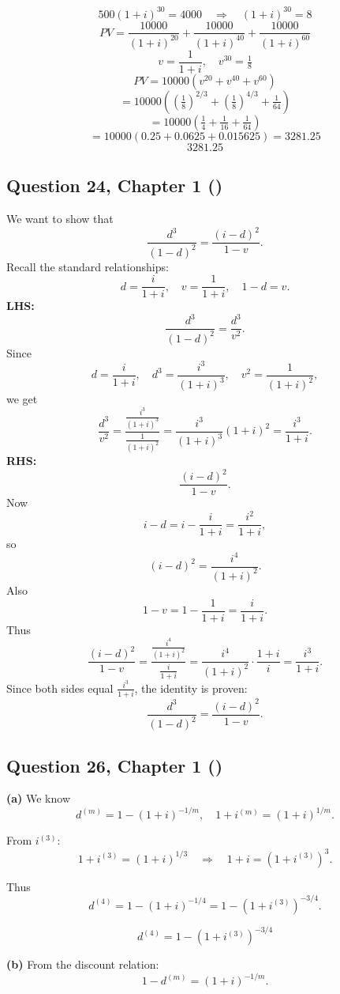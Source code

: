 \documentclass[12pt, a4paper]{article}
\begin{document}
\[
500(1+i)^{30} = 4000 \quad \Rightarrow \quad (1+i)^{30} = 8
\]
\[
PV = \frac{10000}{(1+i)^{20}} + \frac{10000}{(1+i)^{40}} + \frac{10000}{(1+i)^{60}}
\]
\[
v = \frac{1}{1+i}, \quad v^{30} = \tfrac{1}{8}
\]
\[
PV = 10000\left(v^{20} + v^{40} + v^{60}\right)
\]
\[
= 10000\left(\left(\tfrac{1}{8}\right)^{2/3} + \left(\tfrac{1}{8}\right)^{4/3} + \tfrac{1}{64}\right)
\]
\[
= 10000\left(\tfrac{1}{4} + \tfrac{1}{16} + \tfrac{1}{64}\right)
\]
\[
= 10000\left(0.25 + 0.0625 + 0.015625\right) = 3281.25
\]
\[
\boxed{3281.25}
\]

\subsection*{Question 24, Chapter 1  (\cite{toi3rd})}

We want to show that
\[
\frac{d^3}{(1-d)^2} = \frac{(i-d)^2}{1-v}.
\]
Recall the standard relationships:
\[
d = \frac{i}{1+i}, \quad v = \frac{1}{1+i}, \quad 1-d = v.
\]
\textbf{LHS:}
\[
\frac{d^3}{(1-d)^2} = \frac{d^3}{v^2}.
\]
Since
\[
d = \frac{i}{1+i}, \quad d^3 = \frac{i^3}{(1+i)^3}, \quad v^2 = \frac{1}{(1+i)^2},
\]
we get
\[
\frac{d^3}{v^2} = \frac{\tfrac{i^3}{(1+i)^3}}{\tfrac{1}{(1+i)^2}}
= \frac{i^3}{(1+i)^3}(1+i)^2 = \frac{i^3}{1+i}.
\]
\textbf{RHS:}
\[
\frac{(i-d)^2}{1-v}.
\]
Now
\[
i-d = i - \frac{i}{1+i} = \frac{i^2}{1+i},
\]
so
\[
(i-d)^2 = \frac{i^4}{(1+i)^2}.
\]
Also
\[
1-v = 1 - \frac{1}{1+i} = \frac{i}{1+i}.
\]
Thus
\[
\frac{(i-d)^2}{1-v} = \frac{\tfrac{i^4}{(1+i)^2}}{\tfrac{i}{1+i}}
= \frac{i^4}{(1+i)^2}\cdot \frac{1+i}{i}
= \frac{i^3}{1+i}.
\]
Since both sides equal \(\tfrac{i^3}{1+i}\), the identity is proven:
\[
\frac{d^3}{(1-d)^2} = \frac{(i-d)^2}{1-v}.
\]

\subsection*{Question 26, Chapter 1  (\cite{toi3rd})}

\textbf{(a)} We know
\[
d^{(m)} = 1 - (1+i)^{-1/m}, \quad 
1+i^{(m)} = (1+i)^{1/m}.
\]

From \(i^{(3)}\):
\[
1+i^{(3)} = (1+i)^{1/3} \quad \Rightarrow \quad 1+i = (1+i^{(3)})^3.
\]

Thus
\[
d^{(4)} = 1 - (1+i)^{-1/4} = 1 - (1+i^{(3)})^{-3/4}.
\]

\[
\boxed{d^{(4)} = 1 - (1+i^{(3)})^{-3/4}}
\]

\bigskip

\textbf{(b)} From the discount relation:
\[
1-d^{(m)} = (1+i)^{-1/m}.
\]
\end{document}
